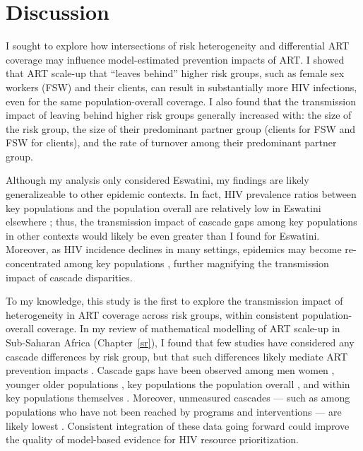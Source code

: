 \section{Discussion}\label{art.disc}
I sought to explore how intersections of risk heterogeneity and differential ART coverage
may influence model-estimated prevention impacts of ART.
I showed that ART scale-up that ``leaves behind'' higher risk groups,
such as female sex workers (FSW) and their clients,
can result in substantially more HIV infections,
even for the same population-overall coverage.
I also found that the transmission impact of leaving behind higher risk groups
generally increased with:
the size of the risk group,
the size of their predominant partner group (\ie clients for FSW and FSW for clients),
and the rate of turnover among their predominant partner group.
\par
Although my analysis only considered Eswatini,
my findings are likely generalizeable to other epidemic contexts.
In fact, HIV prevalence ratios between key populations and the population overall
are relatively low in Eswatini \vs elsewhere \cite{Baral2012,Hessou2019};
thus, the transmission impact of cascade gaps among key populations in other contexts
would likely be even greater than I found for Eswatini.
Moreover, as HIV incidence declines in many settings,
epidemics may become re-concentrated among key populations \cite{Brown2019,Garnett2021},
further magnifying the transmission impact of cascade disparities.
\par
To my knowledge, this study is the first to explore the transmission impact of
heterogeneity in ART coverage across risk groups, within consistent population-overall coverage.
In my review of mathematical modelling of ART scale-up in Sub-Saharan Africa (Chapter~\ref{sr}),
I found that few studies have considered any cascade differences by risk group,
but that such differences likely mediate ART prevention impacts \cite{Knight2022sr}.
Cascade gaps have been observed among men \vs women \cite{Quinn2019,Green2020},
younger \vs older populations \cite{Green2020,Lebelonyane2021},
key populations \vs the population overall \cite{Hakim2018},
and within key populations themselves \cite{Mayanja2018,Jaffer2022}.
Moreover, unmeasured cascades
--- such as among populations who have not been reached by programs and interventions ---
are likely lowest \cite{Hakim2018,Boothe2021}.
Consistent integration of these data going forward could
improve the quality of model-based evidence for HIV resource prioritization.
\par
